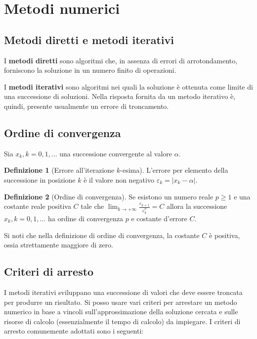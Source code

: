 \documentclass[12pt]{article}
\theoremstyle{plain}%
\theoremstyle{definition}
\newtheorem{defn}{Definizione}[section]
\theoremstyle{remark}
\begin{document}
\section{Metodi numerici}

\subsection{Metodi diretti e metodi iterativi}

I \textbf{metodi diretti} sono algoritmi che, in assenza di errori di arrotondamento, forniscono la soluzione in un numero finito di operazioni.

I \textbf{metodi iterativi} sono algoritmi nei quali la soluzione è ottenuta come limite di una successione di soluzioni. Nella risposta fornita da un metodo iterativo è, quindi, presente usualmente un errore di troncamento.

\subsection{Ordine di convergenza}

Sia $x_k, k = 0, 1,\ldots$ una successione convergente al valore $\alpha$.

\begin{defn}[Errore all'iterazione $k$-esima]
L'errore per elemento della successione in posizione $k$ è il valore non negativo
$\varepsilon_k = |x_k - \alpha|$.
\end{defn}

\begin{defn}[Ordine di convergenza]
Se esistono un numero reale $p \geq 1$ e una costante reale positiva $C$
tale che
$\lim_{k\to+\infty} \frac{\varepsilon_{k+1}}{\varepsilon_{k}^p}=C$
allora la successione $x_k, k = 0, 1,\ldots$ ha ordine di convergenza $p$
e costante d'errore $C$.
\end{defn}

Si noti che nella definizione di ordine di convergenza, la costante $C$
è positiva, ossia strettamente maggiore di zero.

\subsection{Criteri di arresto}

I metodi iterativi sviluppano una successione di valori che deve essere troncata
per produrre un risultato.
Si posso usare vari criteri per arrestare un metodo numerico in base a vincoli
sull'approssimazione della soluzione cercata e sulle risorse di calcolo
(essenzialmente il tempo di calcolo) da impiegare.
I criteri di arresto comunemente adottati sono i seguenti:
\end{document}
